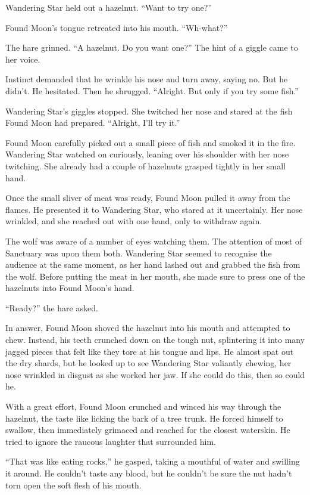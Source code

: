 Wandering Star held out a hazelnut. ``Want to try one?''

Found Moon's tongue retreated into his mouth. ``Wh-what?''

The hare grinned. ``A hazelnut. Do you want one?'' The hint of a giggle came to her voice.

Instinct demanded that he wrinkle his nose and turn away, saying no. But he didn't. He hesitated. Then he shrugged. ``Alright. But only if you try some fish.''

Wandering Star's giggles stopped. She twitched her nose and stared at the fish Found Moon had prepared. ``Alright, I'll try it.''

Found Moon carefully picked out a small piece of fish and smoked it in the fire. Wandering Star watched on curiously, leaning over his shoulder with her nose twitching. She already had a couple of hazelnuts grasped tightly in her small hand.

Once the small sliver of meat was ready, Found Moon pulled it away from the flames. He presented it to Wandering Star, who stared at it uncertainly. Her nose wrinkled, and she reached out with one hand, only to withdraw again.

The wolf was aware of a number of eyes watching them. The attention of most of Sanctuary was upon them both. Wandering Star seemed to recognise the audience at the same moment, as her hand lashed out and grabbed the fish from the wolf. Before putting the meat in her mouth, she made sure to press one of the hazelnuts into Found Moon's hand.

``Ready?'' the hare asked.

In answer, Found Moon shoved the hazelnut into his mouth and attempted to chew. Instead, his teeth crunched down on the tough nut, splintering it into many jagged pieces that felt like they tore at his tongue and lips. He almost spat out the dry shards, but he looked up to see Wandering Star valiantly chewing, her nose wrinkled in disgust as she worked her jaw. If she could do this, then so could he.

With a great effort, Found Moon crunched and winced his way through the hazelnut, the taste like licking the bark of a tree trunk. He forced himself to swallow, then immediately grimaced and reached for the closest waterskin. He tried to ignore the raucous laughter that surrounded him.

``That was like eating rocks,'' he gasped, taking a mouthful of water and swilling it around. He couldn't taste any blood, but he couldn't be sure the nut hadn't torn open the soft flesh of his mouth.

